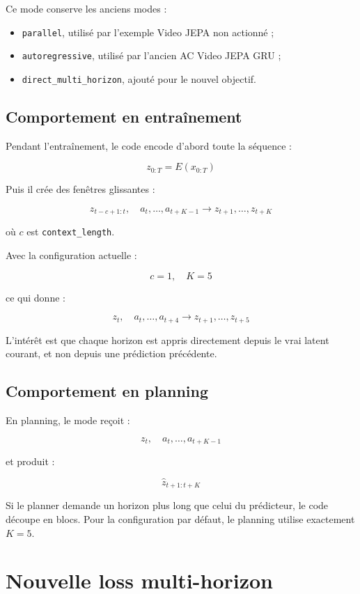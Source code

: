 \documentclass[11pt,a4paper]{article}
\newcommand{\code}[1]{\texttt{#1}}
\begin{document}
Ce mode conserve les anciens modes :

\begin{itemize}
  \item \code{parallel}, utilisé par l'exemple Video JEPA non actionné ;
  \item \code{autoregressive}, utilisé par l'ancien AC Video JEPA GRU ;
  \item \code{direct\_multi\_horizon}, ajouté pour le nouvel objectif.
\end{itemize}

\subsection{Comportement en entraînement}

Pendant l'entraînement, le code encode d'abord toute la séquence :

\[
z_{0:T} = E(x_{0:T})
\]

Puis il crée des fenêtres glissantes :

\[
z_{t-c+1:t},\quad a_t,\dots,a_{t+K-1}
\rightarrow
z_{t+1},\dots,z_{t+K}
\]

où \(c\) est \code{context\_length}.

Avec la configuration actuelle :

\[
c = 1,\quad K = 5
\]

ce qui donne :

\[
z_t,\quad a_t,\dots,a_{t+4}
\rightarrow
z_{t+1},\dots,z_{t+5}
\]

L'intérêt est que chaque horizon est appris directement depuis le vrai latent courant,
et non depuis une prédiction précédente.

\subsection{Comportement en planning}

En planning, le mode reçoit :

\[
z_t,\quad a_t,\dots,a_{t+K-1}
\]

et produit :

\[
\hat z_{t+1:t+K}
\]

Si le planner demande un horizon plus long que celui du prédicteur, le code découpe
en blocs. Pour la configuration par défaut, le planning utilise exactement \(K=5\).

\section{Nouvelle loss multi-horizon}
\end{document}

